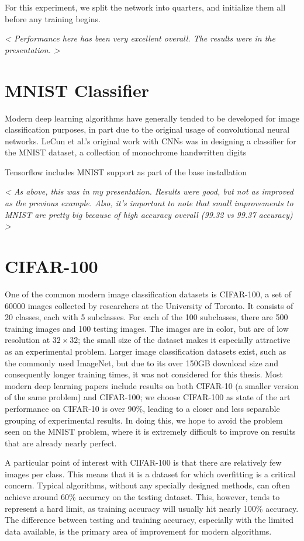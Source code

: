 For this experiment, we split the network into quarters, and initialize them all before any training begins.

\emph{ < Performance here has been very excellent overall. The results were in the presentation. > }




\section{MNIST Classifier}
Modern deep learning algorithms have generally tended to be developed for image classification purposes, in part due to the original usage of convolutional neural networks.
LeCun et al.'s original work with CNNs \cite{lecun1998gradient} was in designing a classifier for the MNIST dataset, a collection of monochrome handwritten digits 

Tensorflow includes MNIST support as part of the base installation

\emph{ < As above, this was in my presentation. Results were good, but not as improved as the previous example. Also, it's important to note that small improvements to MNIST are pretty big because of high accuracy overall (99.32 vs 99.37 accuracy) > }


\section{CIFAR-100}
One of the common modern image classification datasets is CIFAR-100, a set of 60000 images collected by researchers at the University of Toronto.
It consists of 20 classes, each with 5 subclasses.
For each of the 100 subclasses, there are 500 training images and 100 testing images.
The images are in color, but are of low resolution at $32\times 32$; the small size of the dataset makes it especially attractive as an experimental problem.
Larger image classification datasets exist, such as the commonly used ImageNet, but due to its over 150GB download size and consequently longer training times, it was not considered for this thesis.
Most modern deep learning papers include results on both CIFAR-10 (a smaller version of the same problem) and CIFAR-100; we choose CIFAR-100 as state of the art performance on CIFAR-10 is over 90\%, leading to a closer and less separable grouping of experimental results.
In doing this, we hope to avoid the problem seen on the MNIST problem, where it is extremely difficult to improve on results that are already nearly perfect.

A particular point of interest with CIFAR-100 is that there are relatively few images per class.
This means that it is a dataset for which overfitting is a critical concern.
Typical algorithms, without any specially designed methods, can often achieve around 60\% accuracy on the testing dataset.
This, however, tends to represent a hard limit, as training accuracy will usually hit nearly 100\% accuracy.
The difference between testing and training accuracy, especially with the limited data available, is the primary area of improvement for modern algorithms.

